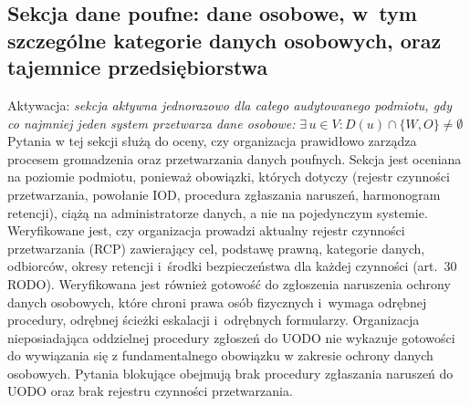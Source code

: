 \subsection{Sekcja dane poufne: dane osobowe, w~tym szczególne kategorie danych osobowych, oraz tajemnice przedsiębiorstwa}
\noindent Aktywacja: \textit{sekcja aktywna jednorazowo dla całego audytowanego podmiotu, gdy co najmniej jeden system przetwarza dane osobowe:} $\exists\, u \in V : D(u) \cap \{W, O\} \neq \emptyset$\\
Pytania w tej sekcji służą do oceny, czy organizacja prawidłowo zarządza procesem gromadzenia oraz przetwarzania danych poufnych. Sekcja jest oceniana na poziomie podmiotu, ponieważ obowiązki, których dotyczy (rejestr czynności przetwarzania, powołanie IOD, procedura zgłaszania naruszeń, harmonogram retencji), ciążą na administratorze danych, a nie na pojedynczym systemie. Weryfikowane jest, czy organizacja prowadzi aktualny rejestr czynności przetwarzania (RCP) zawierający cel, podstawę prawną, kategorie danych, odbiorców, okresy retencji i~środki bezpieczeństwa dla każdej czynności (art.~30 RODO). Weryfikowana jest również gotowość do zgłoszenia naruszenia ochrony danych osobowych, które chroni prawa osób fizycznych i~wymaga odrębnej procedury, odrębnej ścieżki eskalacji i~odrębnych formularzy. Organizacja nieposiadająca oddzielnej procedury zgłoszeń do UODO nie wykazuje gotowości do wywiązania się z fundamentalnego obowiązku w zakresie ochrony danych osobowych. Pytania blokujące obejmują brak procedury zgłaszania naruszeń do UODO oraz brak rejestru czynności przetwarzania.

